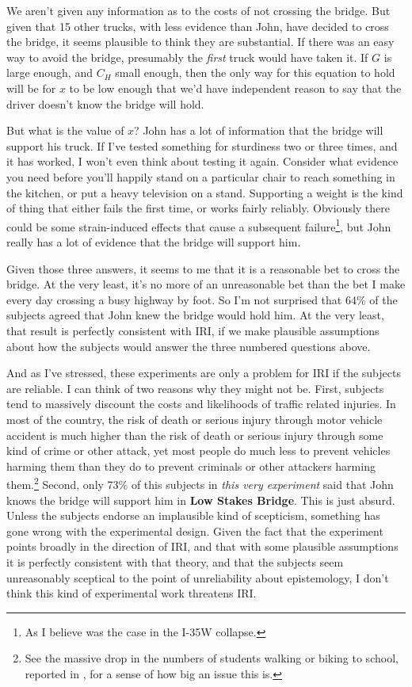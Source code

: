 \documentclass[oneside, a4paper]{book}
\begin{document}
We aren't given any information as to the costs of not crossing the bridge. But given that 15 other trucks, with less evidence than John, have decided to cross the bridge, it seems plausible to think they are substantial. If there was an easy way to avoid the bridge, presumably the \textit{first} truck would have taken it. If $G$ is large enough, and $C_H$ small enough, then the only way for this equation to hold will be for $x$ to be low enough that we'd have independent reason to say that the driver doesn't know the bridge will hold.

But what is the value of $x$? John has a lot of information that the bridge will support his truck. If I've tested something for sturdiness two or three times, and it has worked, I won't even think about testing it again. Consider what evidence you need before you'll happily stand on a particular chair to reach something in the kitchen, or put a heavy television on a stand. Supporting a weight is the kind of thing that either fails the first time, or works fairly reliably. Obviously there could be some strain-induced effects that cause a subsequent failure\footnote{As I believe was the case in the I-35W collapse.}, but John really has a lot of evidence that the bridge will support him.

Given those three answers, it seems to me that it is a reasonable bet to cross the bridge. At the very least, it's no more of an unreasonable bet than the bet I make every day crossing a busy highway by foot. So I'm not surprised that 64\% of the subjects agreed that John knew the bridge would hold him. At the very least, that result is perfectly consistent with IRI, if we make plausible assumptions about how the subjects would answer the three numbered questions above.

And as I've stressed, these experiments are only a problem for IRI if the subjects are reliable. I can think of two reasons why they might not be. First, subjects tend to massively discount the costs and likelihoods of traffic related injuries. In most of the country, the risk of death or serious injury through motor vehicle accident is much higher than the risk of death or serious injury through some kind of crime or other attack, yet most people do much less to prevent vehicles harming them than they do to prevent criminals or other attackers harming them.\footnote{See the massive drop in the numbers of students walking or biking to school, reported in \cite{Ham2008}, for a sense of how big an issue this is.} Second, only 73\% of this subjects in \textit{this very experiment} said that John knows the bridge will support him in \textbf{Low Stakes Bridge}. This is just absurd. Unless the subjects endorse an implausible kind of scepticism, something has gone wrong with the experimental design. Given the fact that the experiment points broadly in the direction of IRI, and that with some plausible assumptions it is perfectly consistent with that theory, and that the  subjects seem unreasonably sceptical to the point of unreliability about epistemology, I don't think this kind of experimental work threatens IRI.
\end{document}
